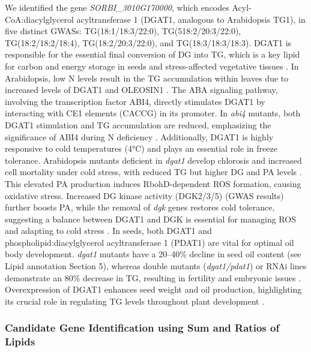 \documentclass[10pt,letterpaper]{article}
\begin{document}
We identified the gene \textit{SORBI\_3010G170000}, which encodes Acyl‐CoA:diacylglycerol acyltransferase 1 (DGAT1, analogous to Arabidopsis TG1), in five distinct GWASs: TG(18:1/18:3/22:0), TG(518:2/20:3/22:0), TG(18:2/18:2/18:4), TG(18:2/20:3/22:0), and TG(18:3/18:3/18:3). DGAT1 is responsible for the essential final conversion of DG into TG, which is a key lipid for carbon and energy storage in seeds and stress-affected vegetative tissues \cite{Zhang2009,Yang2011}. In Arabidopsis, low N levels result in the TG accumulation within leaves due to increased levels of DGAT1 and OLEOSIN1 \cite{Yang2011}. The ABA signaling pathway, involving the transcription factor ABI4, directly stimulates DGAT1 by interacting with CE1 elements (CACCG) in its promoter. In \emph{abi4} mutants, both DGAT1 stimulation and TG accumulation are reduced, emphasizing the significance of ABI4 during N deficiency \cite{Yang2011}. Additionally, DGAT1 is highly responsive to cold temperatures (4°C) and plays an essential role in freeze tolerance. Arabidopsis mutants deficient in \emph{dgat1} develop chlorosis and increased cell mortality under cold stress, with reduced TG but higher DG and PA levels \cite{Tan2018}. This elevated PA production induces RbohD-dependent ROS formation, causing oxidative stress. Increased DG kinase activity (DGK2/3/5) (GWAS results) further boosts PA, while the removal of \emph{dgk} genes restores cold tolerance, suggesting a balance between DGAT1 and DGK is essential for managing ROS and adapting to cold stress \cite{Tan2018}. In seeds, both DGAT1 and phospholipid:diacylglycerol acyltransferase 1 (PDAT1) are vital for optimal oil body development. \emph{dgat1} mutants have a 20–40\% decline in seed oil content (see Lipid annotation Section 5), whereas double mutants (\emph{dgat1/pdat1}) or RNAi lines demonstrate an 80\% decrease in TG, resulting in fertility and embryonic issues \cite{Zhang2009}. Overexpression of DGAT1 enhances seed weight and oil production, highlighting its crucial role in regulating TG levels throughout plant development \cite{Zhang2009,Yang2011}.



\subsubsection*{Candidate Gene Identification using Sum and Ratios of Lipids}
\end{document}
